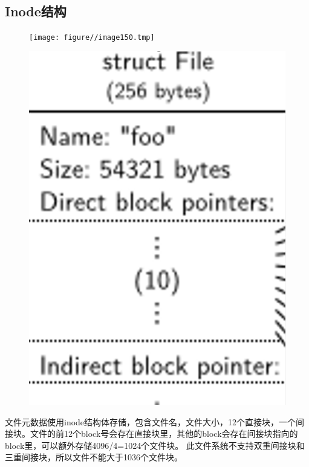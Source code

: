 \documentclass[a4paper,12pt]{report}
\begin{document}
\subsection{Inode结构}
\begin{figure}[H]
	\centering
	\texttt{[image: figure//image150.tmp]}
\end{figure}
\begin{figure}[H]
	\centering
	\includegraphics [width=1.0\textwidth]{figure//imagefuck.png}
\end{figure}
文件元数据使用inode结构体存储，包含文件名，文件大小，12个直接块，一个间接块。文件的前12个block号会存在直接块里，其他的block会存在间接块指向的block里，可以额外存储4096/4=1024个文件块。
此文件系统不支持双重间接块和三重间接块，所以文件不能大于1036个文件块。
\end{document}
